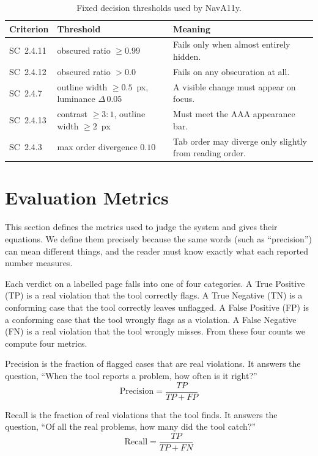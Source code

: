\begin{table}[ht]
  \centering
  \caption{Fixed decision thresholds used by NavA11y.}
  \label{tab:thresholds}
  \begin{tabular}{l p{6.2cm} p{5.6cm}}
    \toprule
    Criterion & Threshold & Meaning \\
    \midrule
    SC~2.4.11 & obscured ratio $\geq 0.99$ & Fails only when almost entirely hidden. \\
    SC~2.4.12 & obscured ratio $> 0.0$ & Fails on any obscuration at all. \\
    SC~2.4.7 & outline width $\geq 0.5$~px, luminance $\Delta\,0.05$ & A visible change must appear on focus. \\
    SC~2.4.13 & contrast $\geq 3{:}1$, outline width $\geq 2$~px & Must meet the AAA appearance bar. \\
    SC~2.4.3 & max order divergence $0.10$ & Tab order may diverge only slightly from reading order. \\
    \bottomrule
  \end{tabular}
\end{table}

\section{Evaluation Metrics}
\label{sec:res-metrics}

This section defines the metrics used to judge the system and gives their equations. We
define them precisely because the same words (such as ``precision'') can mean different
things, and the reader must know exactly what each reported number measures.

Each verdict on a labelled page falls into one of four categories. A True Positive (TP) is
a real violation that the tool correctly flags. A True Negative (TN) is a conforming case
that the tool correctly leaves unflagged. A False Positive (FP) is a conforming case that
the tool wrongly flags as a violation. A False Negative (FN) is a real violation that the
tool wrongly misses. From these four counts we compute four metrics.

Precision is the fraction of flagged cases that are real violations. It answers the
question, ``When the tool reports a problem, how often is it right?''
\begin{equation}
  \text{Precision} = \frac{TP}{TP + FP}
\end{equation}

Recall is the fraction of real violations that the tool finds. It answers the question,
``Of all the real problems, how many did the tool catch?''
\begin{equation}
  \text{Recall} = \frac{TP}{TP + FN}
\end{equation}

